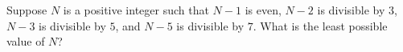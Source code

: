 Suppose $N$ is a positive integer such that $N-1$ is even, $N-2$ is divisible by $3$, $N-3$ is divisible by $5$, and $N-5$ is divisible by $7$. What is the least possible value of $N$?

